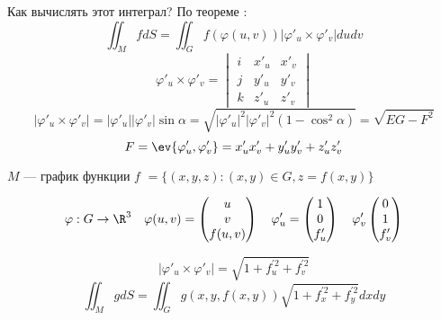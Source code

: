 \begin{remark}
    Как вычислять этот интеграл? По теореме :
    \[\iint_M fdS = \iint_G f(\varphi(u, v)) |\varphi'_u \times \varphi'_v| du dv\]
    \[\varphi'_u \times \varphi'_v = \begin{vmatrix}
            i & x'_u & x'_v \\
            j & y'_u & y'_v \\
            k & z'_u & z'_v
        \end{vmatrix}\]
    \[ |\varphi'_u \times \varphi'_v| = |\varphi'_u| |\varphi'_v| \sin \alpha = \sqrt{ |\varphi'_u|^2 |\varphi'_v|^2 (1 - \cos^2\alpha) } = \sqrt{EG - F^2} \]
    \[F = \ev{\varphi'_u, \varphi'_v} = x'_u x'_v + y'_u y'_v + z'_u z'_v\]
\end{remark}

\begin{example}
    \(M\) --- график функции \(f\) \( = \{(x, y, z) : (x, y) \in G, z = f(x, y)\} \)

    \[\varphi : G \to \R^3 \quad \varphi(u, v) = \begin{pmatrix} u \\ v \\ f(u, v) \end{pmatrix} \quad \varphi'_u = \begin{pmatrix} 1 \\ 0 \\ f'_u \end{pmatrix} \quad \varphi'_v \begin{pmatrix} 0 \\ 1 \\ f'_v \end{pmatrix} \]

    \[|\varphi'_u \times \varphi'_v| = \sqrt{1 + f_u^{\prime 2} + f_v^{\prime 2}}\]
    \[\iint_M g dS = \iint_G g(x, y, f(x, y)) \sqrt{1 + f_x^{\prime 2} + f_y^{\prime 2}} dx dy\]
\end{example}